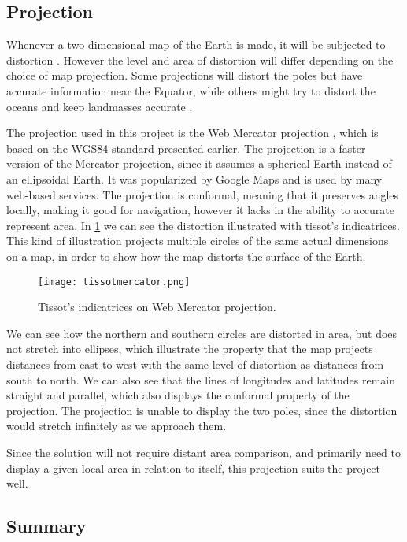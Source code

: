 \subsection{Projection}

Whenever a two dimensional map of the Earth is made, it will be subjected to distortion \cite{projectionalbum}. However the level and area of distortion will differ depending on the choice of map projection. Some projections will distort the poles but have accurate information near the Equator, while others might try to distort the oceans and keep landmasses accurate \cite{website:Wikipedia-mapprojections}.

The projection used in this project is the Web Mercator projection \cite{webmercator}, which is based on the WGS84 standard presented earlier. The projection is a faster version of the Mercator projection, since it assumes a spherical Earth instead of an ellipsoidal Earth. It was popularized by Google Maps and is used by many web-based services. The projection is conformal, meaning that it preserves angles locally, making it good for navigation, however it lacks in the ability to accurate represent area\cite{mercatorcritique}. In \cref{tissots} we can see the distortion illustrated with tissot's indicatrices\cite{tissot}. This kind of illustration projects multiple circles of the same actual dimensions on a map, in order to show how the map distorts the surface of the Earth.

\begin{figure}
    \centering
\texttt{[image: tissotmercator.png]}
\caption{Tissot's indicatrices on Web Mercator projection.}
\label{tissots}
\end{figure}

We can see how the northern and southern circles are distorted in area, but does not stretch into ellipses, which illustrate the property that the map projects distances from east to west with the same level of distortion as distances from south to north. We can also see that the lines of longitudes and latitudes remain straight and parallel, which also displays the conformal property of the projection. The projection is unable to display the two poles, since the distortion would stretch infinitely as we approach them.

Since the solution will not require distant area comparison, and primarily need to display a given local area in relation to itself, this projection suits the project well.


\subsection{Summary}

